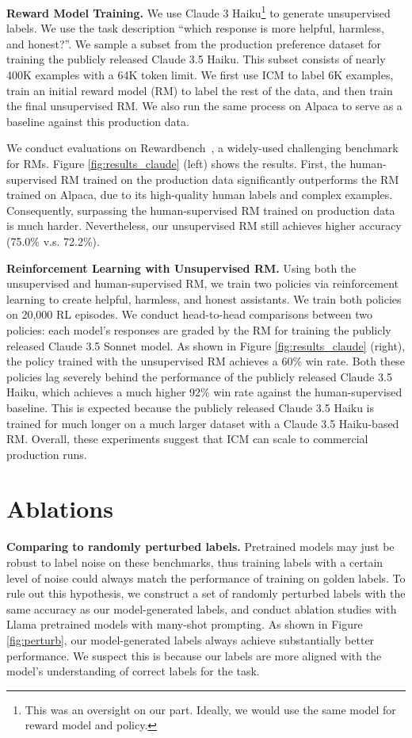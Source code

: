 \documentclass{article}
\newcommand{\ourmethod}[0]{\textsc{ICM}\xspace}
\newcommand{\ph}[1]{{\color{blue}[\textbf{ph:} #1]}}
\begin{document}
\textbf{Reward Model Training.} We use Claude 3 Haiku\footnote{This was an oversight on our part. Ideally, we would use the same model for reward model and policy.} to generate unsupervised labels. We use the task description ``which response is more helpful, harmless, and honest?''. We sample a subset from the production preference dataset for training the publicly released Claude 3.5 Haiku. This subset consists of nearly 400K examples with a 64K token limit. We first use \ourmethod to label 6K examples, train an initial reward model (RM) to label the rest of the data, and then train the final unsupervised RM. We also run the same process on Alpaca to serve as a baseline against this production data.

We conduct evaluations on Rewardbench~\citep{lambert2024rewardbench}, a widely-used challenging benchmark for RMs. Figure \ref{fig:results_claude} (left) shows the results. First, the human-supervised RM trained on the production data significantly outperforms the RM trained on Alpaca, due to its high-quality human labels and complex examples. Consequently, surpassing the human-supervised RM trained on production data is much harder. Nevertheless, our unsupervised RM still achieves higher accuracy (75.0\% v.s. 72.2\%).

\textbf{Reinforcement Learning with Unsupervised RM.}
Using both the unsupervised and human-supervised RM, we train two policies via reinforcement learning to create helpful, harmless, and honest assistants. We train both policies on 20,000 RL episodes. We conduct head-to-head comparisons between two policies: each model's responses are graded by the RM for training the publicly released Claude 3.5 Sonnet model. 
As shown in Figure \ref{fig:results_claude} (right), the policy trained with the unsupervised RM achieves a 60\% win rate. Both these policies lag severely behind the performance of the publicly released Claude 3.5 Haiku, which achieves a much higher 92\% win rate against the human-supervised baseline. This is expected because the publicly released Claude 3.5 Haiku is trained for much longer on a much larger dataset with a Claude 3.5 Haiku-based RM. Overall, these experiments suggest that \ourmethod can scale to commercial production runs.

\section{Ablations}
\label{sec:ablations}

\textbf{Comparing to randomly perturbed labels.} Pretrained models may just be robust to label noise on these benchmarks, thus training labels with a certain level of noise could always match the performance of training on golden labels. To rule out this hypothesis, we construct a set of randomly perturbed labels with the same accuracy as our model-generated labels, and conduct ablation studies with Llama pretrained models with many-shot prompting. As shown in Figure \ref{fig:perturb}, our model-generated labels always achieve substantially better performance. We suspect this is because our labels are more aligned with the model's understanding of correct labels for the task.
\end{document}
